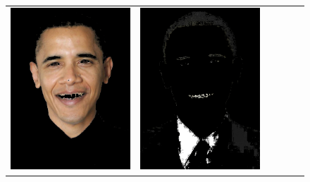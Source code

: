 \documentclass[journal,onecolumn]{IEEEtran}
\begin{document}
\begin{figure}[htb]
{\begin{tabular}{cccccc}
	\includegraphics[scale=0.3]{images/skinDetect.png}

&

	\includegraphics[scale=0.3]{images/hairDetect.png}


\end{tabular}}
\end{figure}
\end{document}
